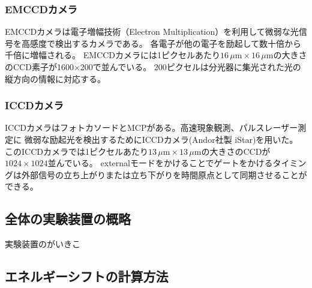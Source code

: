 \subsubsection*{EMCCDカメラ}
EMCCDカメラは電子増幅技術（Electron Multiplication）を利用して微弱な光信号を高感度で検出するカメラである。
各電子が他の電子を励起して数十倍から千倍に増幅される。
EMCCDカメラには1ピクセルあたり$16 \, \mu \text{m} \times 16 \, \mu \text{m}$の大きさのCCD素子が1600$\times$200で並んでいる。
200ピクセルは分光器に集光された光の縦方向の情報に対応する。

\subsubsection*{ICCDカメラ}

ICCDカメラはフォトカソードとMCPがある。高速現象観測、パルスレーザー測定に
微弱な励起光を検出するためにICCDカメラ(Andor社製 iStar)を用いた。
このICCDカメラでは1ピクセルあたり$13 \, \mu \text{m} \times 13 \, \mu \text{m}$の大きさのCCDが$1024 \times 1024$並んでいる。
externalモードをかけることでゲートをかけるタイミングは外部信号の立ち上がりまたは立ち下がりを時間原点として同期させることができる。

\subsection{全体の実験装置の概略}
実験装置のがいきこ

\subsection{エネルギーシフトの計算方法}
